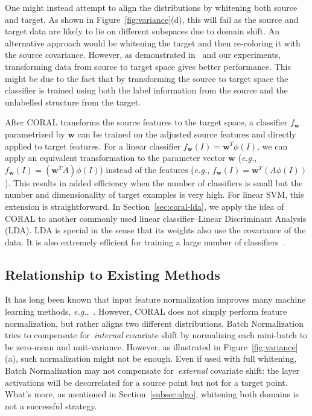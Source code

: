 \documentclass[graybox]{svmult}
\newcommand{\wSrc}{\vec{w}}
\renewcommand\vec[1]{\mathbf{#1}}
\newcommand\eg{\emph{e.g.}}
\begin{document}
One might instead attempt to align the distributions by whitening both source and target. As shown in Figure~\ref{fig:variance}(d), this will fail as the source and target data are likely to lie on different subspaces due to domain shift. An alternative approach would be whitening the target and then re-coloring it with the source covariance. However, as demonstrated in~\cite{outlooks,sa} and our experiments, transforming data from source to target space gives better performance. 
This might be due to the fact that by transforming the source to target space the classifier is trained using both the label information from the source and the unlabelled structure from the target.

After CORAL transforms the source features to the target space, a classifier $f_{\wSrc}$ parametrized by $\wSrc$ can be trained on the adjusted source features and directly applied to target features. For a linear classifier $f_{\wSrc}(I) =  \wSrc^T \phi(I)$, we can apply an equivalent transformation to the parameter vector $\wSrc$ (\eg, $f_{\wSrc}(I) =  (\wSrc^TA) \phi(I)$) instead of the features (\eg, $f_{\wSrc}(I) =  \wSrc^T(A\phi(I))$). This results in added efficiency when the number of classifiers is small but the number and dimensionality of target examples is very high. For linear SVM, this extension is straightforward. In Section~\ref{sec:coral-lda}, we apply the idea of CORAL to another commonly used linear classifier--Linear Discriminant Analysis (LDA). LDA is special in the sense that its weights also use the covariance of the data. It is also extremely efficient for training a large number of classifiers~\cite{who}. 

\subsection{Relationship to Existing Methods} 
It has long been known that input feature normalization improves many machine learning methods, \eg,~\cite{batchnorm}. However, CORAL does not simply perform feature normalization, but rather aligns two different distributions. Batch Normalization~\cite{batchnorm} tries to compensate for~\emph{internal} covariate shift by normalizing each mini-batch to be zero-mean and unit-variance. However, as illustrated in Figure~\ref{fig:variance}(a), such normalization might not be enough. Even if used with full whitening, Batch Normalization may not compensate for~\emph{external} covariate shift: the layer activations will be decorrelated for a source point but not for a target point. What's more, as mentioned in Section~\ref{subsec:algo}, whitening both domains is not a successful strategy.
\end{document}
